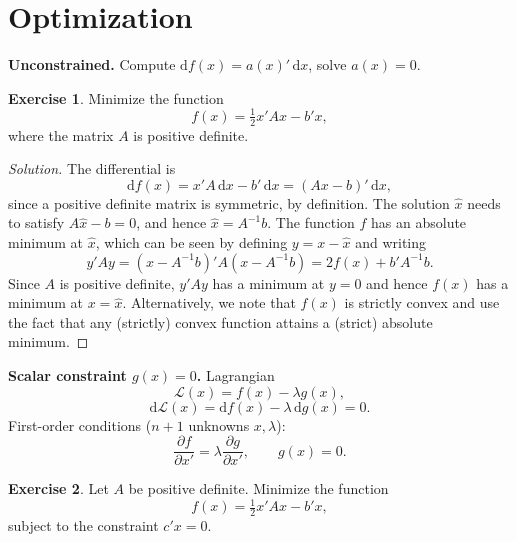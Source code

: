 \documentclass[14pt]{extarticle}
\theoremstyle{plain}
\theoremstyle{definition}
\newtheorem{exercise}{Exercise}
\theoremstyle{remark}
\newenvironment{solution}{%
  \begin{proof}[Solution]%
}{%
  \end{proof}%
}
\newcommand{\dd}{\mathrm{d}}
\begin{document}
\section{Optimization}\label{sec:5}

\textbf{Unconstrained.} Compute $\dd f(x) = a(x)'\,\dd x$, solve $a(x) = 0$.

\begin{exercise}\label{exer:14}
Minimize the function
\[
f(x) = \tfrac{1}{2} x'Ax - b'x,
\]
where the matrix $A$ is positive definite.
\end{exercise}

\begin{solution}
The differential is
\[
\dd f(x) = x'A\, \dd x - b'\, \dd x = (Ax - b)'\, \dd x,
\]
since a positive definite matrix is symmetric, by definition. The solution $\hat{x}$ needs to satisfy $A\hat{x} - b = 0$, and hence $\hat{x} = A^{-1}b$.
The function $f$ has an absolute minimum at $\hat{x}$, which can be seen by defining $y = x - \hat{x}$ and writing
\[
y'Ay = (x - A^{-1}b)'A(x - A^{-1}b) = 2f(x) + b'A^{-1}b.
\]
Since $A$ is positive definite, $y'Ay$ has a minimum at $y = 0$ and hence $f(x)$ has a minimum at $x = \hat{x}$. Alternatively, we note that $f(x)$ is strictly convex and use the fact that any (strictly) convex function attains a (strict) absolute minimum.
\end{solution}

\textbf{Scalar constraint $g(x) = 0$.} Lagrangian
\begin{equation}\label{eq:20}
\mathcal{L}(x) = f(x) - \lambda g(x),
\end{equation}
\begin{equation}\label{eq:21}
\dd\mathcal{L}(x) = \dd f(x) - \lambda\, \dd g(x) = 0.
\end{equation}
First-order conditions ($n+1$ unknowns $x, \lambda$):
\begin{equation}\label{eq:22}
\frac{\partial f}{\partial x'} = \lambda \frac{\partial g}{\partial x'}, \qquad g(x) = 0.
\end{equation}

\begin{exercise}\label{exer:15}
Let $A$ be positive definite. Minimize the function
\[
f(x) = \tfrac{1}{2} x'Ax - b'x,
\]
subject to the constraint $c'x = 0$.
\end{exercise}
\end{document}

